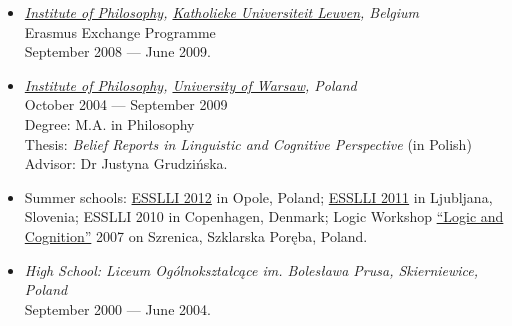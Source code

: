 \documentclass[a4paper,12pt]{article}
\begin{document}
\begin{small}


  
  \begin{itemize}
  \item \emph{\href{http://hiw.kuleuven.be/eng/}{Institute of Philosophy}, \href{http://www.kuleuven.be}{Katholieke Universiteit Leuven}, Belgium}\\
    Erasmus Exchange Programme\\
    September 2008 --- June 2009.
    
  \item \emph{\href{http://www.filozofia.uw.edu.pl}{Institute of
        Philosophy}, \href{http://www.uw.edu.pl}{University of Warsaw}, Poland}\\
    October 2004 --- September 2009\\
    Degree: M.A. in Philosophy\\
    Thesis: \emph{Belief Reports in Linguistic and Cognitive
      Perspective} (in Polish)\\
    Advisor: Dr Justyna Grudzińska.
    


  \item Summer schools: %
    \href{http://www.esslli2012.pl}{ESSLLI 2012} in Opole, Poland;
    \href{http://esslli2011.ijs.si}{ESSLLI 2011} in Ljubljana,
    Slovenia;
    ESSLLI 2010 in Copenhagen, Denmark;
    Logic Workshop
    \href{http://www.logika.uw.edu.pl/warsztaty2007/index.html}{``Logic
      and Cognition''} 2007 on Szrenica, Szklarska Poręba, Poland.

  \item \emph{High School: Liceum Ogólnokształcące im. Bolesława
      Prusa, Skierniewice, Poland}\\
    September 2000 --- June 2004.


\end{itemize}
\end{small}
\end{document}
